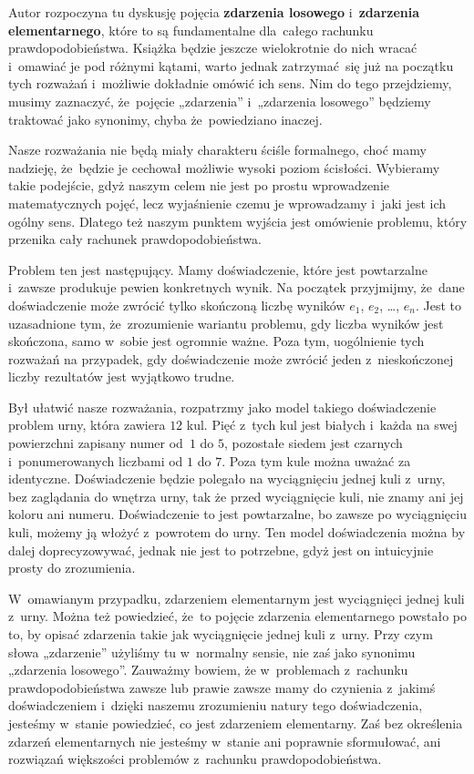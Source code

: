 \documentclass[a4paper,11pt]{article}
\numberwithin{equation}{section}
\begin{document}
\label{subsec:Uwagi-do-konkretnych-stron}



\noindent
{}


\noindent
{} Autor rozpoczyna tu dyskusję pojęcia \textbf{zdarzenia losowego}
i~\textbf{zdarzenia elementarnego}, które to są fundamentalne dla~całego
rachunku prawdopodobieństwa. Książka będzie jeszcze wielokrotnie do nich
wracać i~omawiać je pod różnymi kątami, warto jednak zatrzymać~się już na
początku tych rozważań i~możliwie dokładnie omówić ich sens. Nim do tego
przejdziemy, musimy zaznaczyć, że~pojęcie „zdarzenia” i~„zdarzenia losowego”
będziemy traktować jako synonimy, chyba że~powiedziano inaczej.

Nasze rozważania nie będą miały charakteru ściśle formalnego, choć mamy
nadzieję, że~będzie je cechował możliwie wysoki poziom ścisłości. Wybieramy
takie podejście, gdyż naszym celem nie jest po prostu wprowadzenie
matematycznych pojęć, lecz wyjaśnienie czemu je wprowadzamy i~jaki jest ich
ogólny sens. Dlatego też naszym punktem wyjścia jest omówienie problemu,
który przenika cały rachunek prawdopodobieństwa.

Problem ten jest następujący. Mamy doświadczenie, które jest powtarzalne
i~zawsze produkuje pewien konkretnych wynik. Na początek przyjmijmy, że~dane
doświadczenie może zwrócić tylko skończoną liczbę wyników $e_{ 1 }$,
$e_{ 2 }$, \ldots, $e_{ n }$. Jest to uzasadnione tym, że~zrozumienie wariantu
problemu, gdy liczba wyników jest
skończona, samo w~sobie jest ogromnie ważne. Poza tym, uogólnienie tych
rozważań na przypadek, gdy doświadczenie może zwrócić jeden z~nieskończonej
liczby rezultatów jest wyjątkowo trudne.

Był ułatwić nasze rozważania, rozpatrzmy jako model takiego doświadczenie
problem urny, która zawiera $12$ kul. Pięć z~tych kul jest białych i~każda
na swej powierzchni zapisany numer od~$1$ do $5$, pozostałe siedem jest
czarnych i~ponumerowanych liczbami od $1$ do $7$. Poza tym kule można uważać
za identyczne. Doświadczenie będzie polegało na wyciągnięciu jednej kuli
z~urny, bez zaglądania do wnętrza urny,
tak że przed wyciągnięcie kuli, nie znamy ani jej koloru ani numeru.
Doświadczenie to jest powtarzalne, bo zawsze po wyciągnięciu kuli, możemy ją
włożyć z~powrotem do urny. Ten model doświadczenia można by dalej
doprecyzowywać, jednak nie jest to potrzebne, gdyż jest on intuicyjnie prosty
do zrozumienia.

W~omawianym przypadku, zdarzeniem elementarnym jest wyciągnięci jednej kuli
z~urny. Można też powiedzieć, że~to pojęcie zdarzenia elementarnego
powstało po to, by opisać zdarzenia takie jak wyciągnięcie jednej kuli
z~urny. Przy czym słowa „zdarzenie” użyliśmy tu w~normalny sensie, nie
zaś jako synonimu „zdarzenia losowego”. Zauważmy bowiem, że w~problemach
z~rachunku prawdopodobieństwa zawsze lub prawie zawsze mamy do czynienia
z~jakimś doświadczeniem i~dzięki naszemu zrozumieniu
natury tego doświadczenia, jesteśmy w~stanie powiedzieć, co jest zdarzeniem
elementarny. Zaś bez określenia zdarzeń elementarnych nie jesteśmy
w~stanie ani poprawnie sformułować, ani rozwiązań większości problemów
z~rachunku prawdopodobieństwa.
\end{document}
